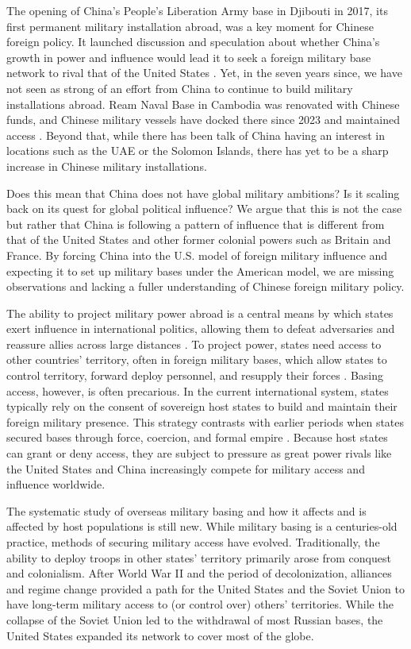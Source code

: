 The opening of China's People's Liberation Army base in Djibouti in 2017, its first permanent military installation abroad, was a key moment for Chinese foreign policy. It launched discussion and speculation about whether China's growth in power and influence would lead it to seek a foreign military base network to rival that of the United States \cite{vertin2020}. Yet, in the seven years since, we have not seen as strong of an effort from China to continue to build military installations abroad. Ream Naval Base in Cambodia was renovated with Chinese funds, and Chinese military vessels have docked there since 2023 and maintained access \cite{gan2023}. Beyond that, while there has been talk of China having an interest in locations such as the UAE or the Solomon Islands, there has yet to be a sharp increase in Chinese military installations.

Does this mean that China does not have global military ambitions? Is it scaling back on its quest for global political influence? We argue that this is not the case but rather that China is following a pattern of influence that is different from that of the United States and other former colonial powers such as Britain and France. By forcing China into the U.S. model of foreign military influence and expecting it to set up military bases under the American model, we are missing observations and lacking a fuller understanding of Chinese foreign military policy. 

The ability to project military power abroad is a central means by which states exert influence in international politics, allowing them to defeat adversaries and reassure allies across large distances \cite{levy2010,markowitz2013,blankenship2022}. To project power, states need access to other countries' territory, often in foreign military bases, which allow states to control territory, forward deploy personnel, and resupply their forces \cite{Harkavy1989,posen2003}. Basing access, however, is often precarious. In the current international system, states typically rely on the consent of sovereign host states to build and maintain their foreign military presence. This strategy contrasts with earlier periods when states secured bases through force, coercion, and formal empire \cite{schmidt2020}. Because host states can grant or deny access, they are subject to pressure as great power rivals like the United States and China increasingly compete for military access and influence worldwide.

The systematic study of overseas military basing and how it affects and is affected by host populations is still new. While military basing is a centuries-old practice, methods of securing military access have evolved. Traditionally, the ability to deploy troops in other states' territory primarily arose from conquest and colonialism. After World War II and the period of decolonization, alliances and regime change provided a path for the United States and the Soviet Union to have long-term military access to (or control over) others' territories. While the collapse of the Soviet Union led to the withdrawal of most Russian bases, the United States expanded its network to cover most of the globe.

